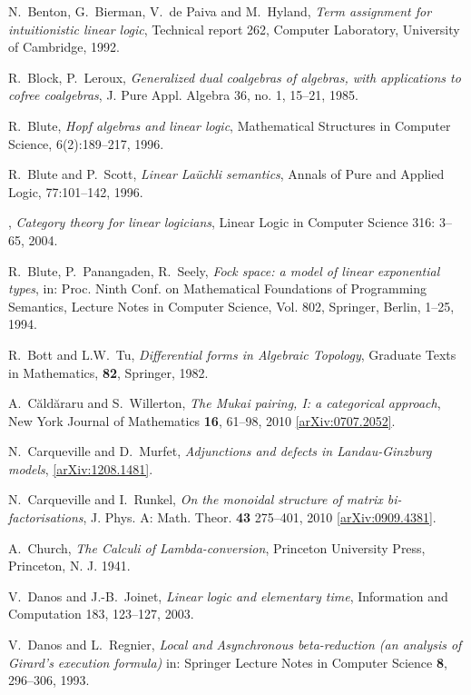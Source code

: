 \documentclass[english,letter paper,12pt,reqno]{article}
\theoremstyle{example}
\numberwithin{equation}{section}
\begin{document}
\begin{thebibliography}{BHLS03}
N.~Benton, G.~Bierman, V.~de Paiva and M.~Hyland, \textsl{Term assignment for intuitionistic linear logic}, Technical report 262, Computer Laboratory, University of Cambridge, 1992.

R.~Block, P.~Leroux, \textsl{Generalized dual coalgebras of algebras, with applications to cofree coalgebras}, J. Pure Appl. Algebra 36, no. 1, 15--21, 1985.

R.~Blute, \textsl{Hopf algebras and linear logic}, Mathematical Structures in Computer Science, 6(2):189--217, 1996.

R.~Blute and P.~Scott, \textsl{Linear {L}a\"{u}chli semantics}, Annals of Pure and Applied Logic, 77:101--142, 1996.

\bysame, \textsl{Category theory for linear logicians}, Linear Logic in Computer Science 316: 3--65, 2004.

R.~Blute, P.~Panangaden, R.~Seely, \textsl{Fock space: a model of linear exponential types}, in: Proc. Ninth Conf. on Mathematical Foundations of Programming Semantics, Lecture Notes in Computer Science, Vol. 802, Springer, Berlin, 1--25, 1994.

R.~Bott and L.W.~Tu, \textsl{Differential forms in {A}lgebraic {T}opology}, Graduate Texts in Mathematics, \textbf{82}, Springer, 1982.

A.~{C\u ald\u araru} and S.~Willerton, \textsl{The Mukai pairing, I: a categorical approach},
New York Journal of Mathematics \textbf{16}, 61--98, 2010
  \href{http://arxiv.org/abs/0707.2052}{[arXiv:0707.2052]}.
  
N.~Carqueville and D.~Murfet, \textsl{Adjunctions and defects in {L}andau-{G}inzburg models}, \href{http://arxiv.org/abs/1208.1481}{[arXiv:1208.1481]}.

N.~Carqueville and I.~Runkel, \textsl{On the monoidal structure of matrix bi-factorisations}, J. Phys.
  A: Math. Theor. \textbf{43} 275--401, 2010
  \href{http://arxiv.org/abs/0909.4381}{[arXiv:0909.4381]}.

A.~Church, \textsl{The {C}alculi of {L}ambda-conversion}, Princeton University Press, Princeton, N. J. 1941.

V.~Danos and J.-B.~Joinet, \textsl{Linear logic and elementary time}, Information and Computation 183, 123--127, 2003.

V.~Danos and L.~Regnier, \textsl{Local and {A}synchronous beta-reduction (an analysis of {G}irard's execution formula)} in: Springer Lecture Notes in Computer Science \textbf{8}, 296--306, 1993.


\end{thebibliography}
\end{document}
